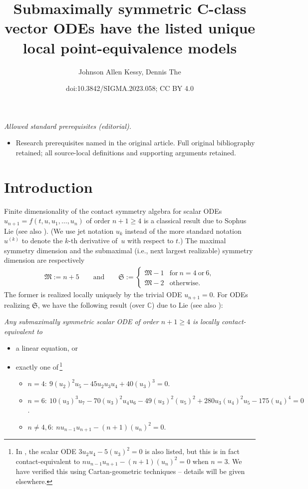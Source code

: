 \documentclass[10pt,a4paper]{amsart}
\title{Submaximally symmetric C-class vector ODEs have the listed unique local point-equivalence models}
\author{Johnson Allen Kessy, Dennis The}
\date{doi:10.3842/SIGMA.2023.058; CC BY 4.0}
\newcommand\fM{\mathfrak{M}}
\newcommand\fS{\mathfrak{S}}
\newcommand{\C}{\mathbb{C}}
\numberwithin{equation}{section}
\begin{document}
\maketitle
\noindent\textit{Allowed standard prerequisites (editorial).}\begin{itemize}
\item Research prerequisites named in the original article. Full original bibliography retained; all source-local definitions and supporting arguments retained.
\end{itemize}\medskip
\section{Introduction}

Finite dimensionality of the contact symmetry algebra for scalar ODEs $u_{n+1}=f(t,u,u_1,\dots,u_n)$ of order $n+1\ge 4$
is a classical result due to Sophus Lie \cite{Lie1893} (see also \cite[Theorem~6.44]{Olver1995}). (We use jet notation $u_k$ instead of the more standard notation $u^{(k)}$ to denote the $k$-th derivative of~$u$ with respect to $t$.) The maximal symmetry dimension and the submaximal (i.e., next largest realizable) symmetry dimension are respectively
\begin{align*}
\fM:=n+5 \qquad \text{and}\qquad \fS := \begin{cases}
\fM-1 & \text{for}\ n=4\ \text{or}\ 6, \\
\fM-2 & \text{otherwise}.
\end{cases}
\end{align*}
 The former is realized locally uniquely by the trivial ODE $u_{n+1} = 0$. For ODEs realizing $\fS$, we have the following result (over $\C$) due to Lie \cite{Lie1924} (see also \cite[pp.~205--206]{Olver1995}): {\em Any submaximally symmetric scalar ODE of order $n+1 \ge 4$ is locally contact-equivalent to
\begin{itemize}\itemsep=0pt
\item[$(a)$] a linear equation, or
\item[$(b)$] exactly one of\,\footnote{In \cite[p.~206]{Olver1995}, the scalar ODE $3 u_2 u_4 - 5 (u_3)^2 = 0$ is also listed, but this is in fact contact-equivalent to $n u_{n-1} u_{n+1} - (n+1) (u_n)^2 = 0$ when $n=3$. We have verified this using Cartan-geometric techniques -- details will be given elsewhere.}
\begin{itemize}\itemsep=0pt
\item[$(i)$] $n=4\colon\ 9 (u_2)^2 u_5 - 45 u_2 u_3 u_4 + 40(u_3)^3 = 0$.
\item[$(ii)$] $n=6\colon\ 10(u_{3})^3u_{7}-70(u_{3})^2u_{4}u_{6} - 49(u_{3})^2(u_{5})^2 + 280u_{3}(u_{4})^2u_{5} -175(u_{4})^4 = 0$.
\item[$(iii)$] $n \neq 4,6\colon\ n u_{n-1} u_{n+1} - (n+1) (u_n)^2 = 0$.
\end{itemize}
\end{itemize}
}
\end{document}
